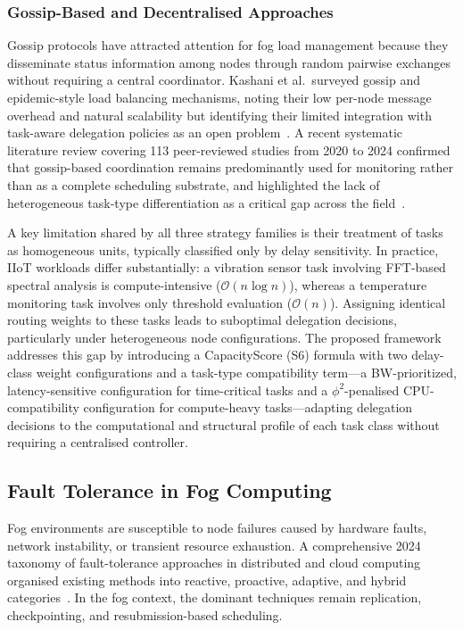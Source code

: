 \documentclass[conference]{IEEEtran}
\begin{document}
\subsubsection{Gossip-Based and Decentralised Approaches}

Gossip protocols have attracted attention for fog load management because they disseminate status information among nodes through random pairwise exchanges without requiring a central coordinator. Kashani et al.\ surveyed gossip and epidemic-style load balancing mechanisms, noting their low per-node message overhead and natural scalability but identifying their limited integration with task-aware delegation policies as an open problem~\cite{kashani2020}. A recent systematic literature review covering 113 peer-reviewed studies from 2020 to 2024 confirmed that gossip-based coordination remains predominantly used for monitoring rather than as a complete scheduling substrate, and highlighted the lack of heterogeneous task-type differentiation as a critical gap across the field~\cite{vijarania2025}.

A key limitation shared by all three strategy families is their treatment of tasks as homogeneous units, typically classified only by delay sensitivity. In practice, IIoT workloads differ substantially: a vibration sensor task involving FFT-based spectral analysis is compute-intensive ($\mathcal{O}(n \log n)$), whereas a temperature monitoring task involves only threshold evaluation ($\mathcal{O}(n)$). Assigning identical routing weights to these tasks leads to suboptimal delegation decisions, particularly under heterogeneous node configurations. The proposed framework addresses this gap by introducing a CapacityScore (S6) formula with two delay-class weight configurations and a task-type compatibility term---a BW-prioritized, latency-sensitive configuration for time-critical tasks and a $\phi^2$-penalised CPU-compatibility configuration for compute-heavy tasks---adapting delegation decisions to the computational and structural profile of each task class without requiring a centralised controller.

\subsection{Fault Tolerance in Fog Computing}

Fog environments are susceptible to node failures caused by hardware faults, network instability, or transient resource exhaustion. A comprehensive 2024 taxonomy of fault-tolerance approaches in distributed and cloud computing organised existing methods into reactive, proactive, adaptive, and hybrid categories~\cite{kirti2024}. In the fog context, the dominant techniques remain replication, checkpointing, and resubmission-based scheduling.
\end{document}
